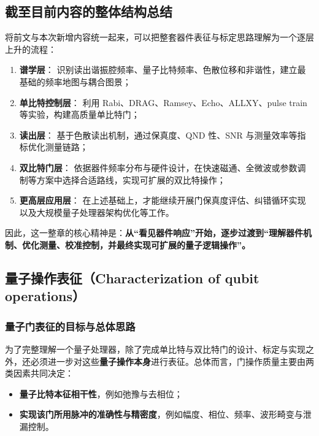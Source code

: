 \documentclass[12pt,a4paper,oneside]{ctexbook}
\begin{document}
\subsection{截至目前内容的整体结构总结}

将前文与本次新增内容统一起来，可以把整套器件表征与标定思路理解为一个逐层上升的流程：

\begin{enumerate}
    \item \textbf{谱学层}：
    识别读出谐振腔频率、量子比特频率、色散位移和非谐性，建立最基础的频率地图与耦合图景；

    \item \textbf{单比特控制层}：
    利用 Rabi、DRAG、Ramsey、Echo、ALLXY、pulse train 等实验，构建高质量单比特门；

    \item \textbf{读出层}：
    基于色散读出机制，通过保真度、QND 性、SNR 与测量效率等指标优化测量链路；

    \item \textbf{双比特门层}：
    依据器件频率分布与硬件设计，在快速磁通、全微波或参数调制等方案中选择合适路线，实现可扩展的双比特操作；

    \item \textbf{更高层应用层}：
    在上述基础上，才能继续开展门保真度评估、纠错循环实现以及大规模量子处理器架构优化等工作。
\end{enumerate}

因此，这一整章的核心精神是：\textbf{从“看见器件响应”开始，逐步过渡到“理解器件机制、优化测量、校准控制，并最终实现可扩展的量子逻辑操作”。}


\subsection{量子操作表征（Characterization of qubit operations）}

\subsubsection{量子门表征的目标与总体思路}

为了完整理解一个量子处理器，除了完成单比特与双比特门的设计、标定与实现之外，还必须进一步对这些\textbf{量子操作本身}进行表征。总体而言，门操作质量主要由两类因素共同决定：
\begin{itemize}
    \item \textbf{量子比特本征相干性}，例如弛豫与去相位；
    \item \textbf{实现该门所用脉冲的准确性与精密度}，例如幅度、相位、频率、波形畸变与泄漏控制。
\end{itemize}
\end{document}
